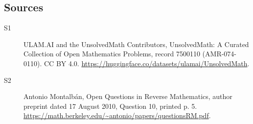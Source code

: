 \documentclass[11pt]{article}
\begin{document}
\subsection{Sources}
\begin{description}
\item[\hypertarget{source:7500110:1}{S1}] ULAM.AI and the UnsolvedMath Contributors, UnsolvedMath: A Curated Collection of Open Mathematics Problems, record 7500110 (AMR-074-0110). CC BY 4.0. \url{https://huggingface.co/datasets/ulamai/UnsolvedMath}.
\item[\hypertarget{source:7500110:2}{S2}] Antonio Montalbán, Open Questions in Reverse Mathematics, author preprint dated 17 August 2010, Question 10, printed p. 5. \url{https://math.berkeley.edu/~antonio/papers/questionsRM.pdf}.
\end{description}
\label{end:7500110}
\end{document}
